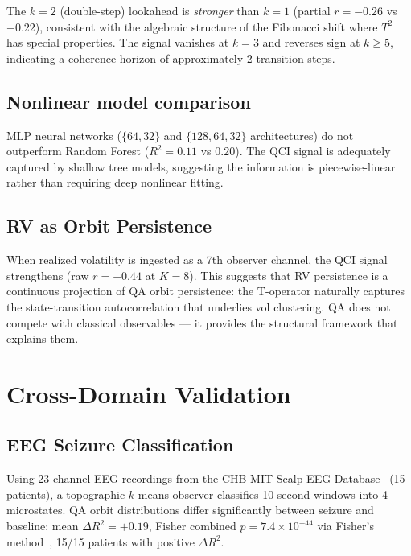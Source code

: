 \documentclass[11pt,a4paper]{article}
\begin{document}
The $k=2$ (double-step) lookahead is \emph{stronger} than $k=1$
(partial $r = -0.26$ vs $-0.22$), consistent with the algebraic
structure of the Fibonacci shift where $T^2$ has special properties.
The signal vanishes at $k=3$ and reverses sign at $k \geq 5$, indicating
a coherence horizon of approximately 2 transition steps.

\subsection{Nonlinear model comparison}

MLP neural networks ($\{64,32\}$ and $\{128,64,32\}$ architectures) do not
outperform Random Forest ($R^2 = 0.11$ vs $0.20$). The QCI signal is
adequately captured by shallow tree models, suggesting the information is
piecewise-linear rather than requiring deep nonlinear fitting.

\subsection{RV as Orbit Persistence}

When realized volatility is ingested as a 7th observer channel, the QCI
signal strengthens (raw $r = -0.44$ at $K=8$). This suggests that RV
persistence is a continuous projection of QA orbit persistence: the
T-operator naturally captures the state-transition autocorrelation that
underlies vol clustering. QA does not compete with classical observables ---
it provides the structural framework that explains them.

\section{Cross-Domain Validation}
\label{sec:cross}

\subsection{EEG Seizure Classification}

Using 23-channel EEG recordings from the CHB-MIT Scalp EEG Database~\cite{chbmit}
(15 patients), a topographic $k$-means observer classifies 10-second windows
into 4 microstates. QA orbit distributions differ significantly between
seizure and baseline: mean $\Delta R^2 = +0.19$, Fisher combined
$p = 7.4 \times 10^{-44}$ via Fisher's method~\cite{fisher1932},
15/15 patients with positive $\Delta R^2$.
\end{document}
